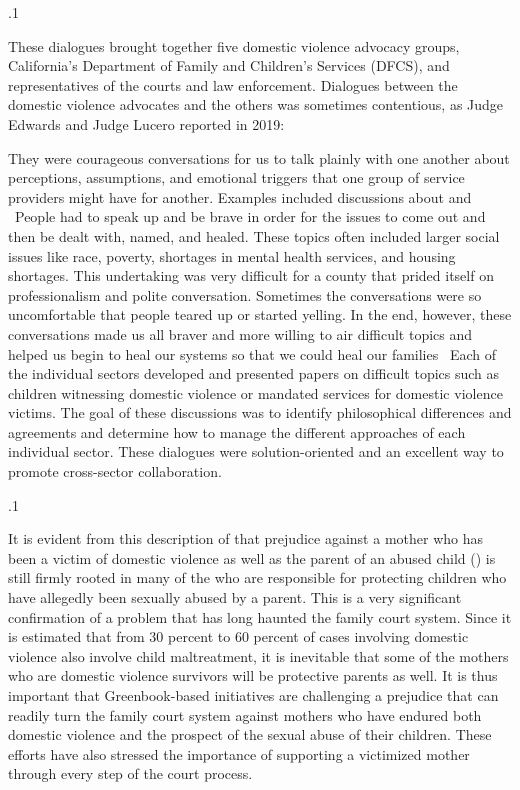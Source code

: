 \documentclass[11pt, twoside]{article}
\begin{document}
{\p.1{%
These dialogues brought together five domestic violence advocacy
groups, California’s Department of Family and Children’s Services
(DFCS), and representatives of the courts and law enforcement. Dialogues between the domestic violence advocates and the others was
sometimes contentious, as Judge Edwards and Judge Lucero reported
in 2019:

\begin{blockQuote}
They were courageous conversations for us to talk plainly with one
another about perceptions, assumptions, and emotional triggers
that one group of service providers might have for another. Examples included discussions about  and  \ellThree{2pt}{2pt}\
\parbreak{}
\ellThree{2pt}{2pt}\ People had to speak up and be brave in order for the issues to
come out and then be dealt with, named, and healed. These topics
often included larger social issues like race, poverty, shortages in
mental health services, and housing shortages. This undertaking
was very difficult for a county that prided itself on professionalism and polite conversation. Sometimes the conversations were so
uncomfortable that people teared up or started yelling. In the end,
however, these conversations made us all braver and more willing
to air difficult topics and helped us begin to heal our systems so
that we could heal our families\ellFour{2pt}{2pt}
\parbreak{}
\ellThree{2pt}{2pt}\ Each of the individual sectors developed and presented
papers on difficult topics such as children witnessing domestic violence or mandated services for domestic violence victims. The goal
of these discussions was to identify philosophical differences and
agreements and determine how to manage the different approaches
of each individual sector. These dialogues were solution-oriented
and an excellent way to promote cross-sector collaboration.
\end{blockQuote}

}%

\p.1{%
It is evident from this description of  that
prejudice against a mother who has been a victim of domestic violence
as well as the parent of an abused child (\q{Why does the parent victim go
back?}) is still firmly rooted in many of the \q{family court auxiliaries}
who are responsible for protecting children who have allegedly been
sexually abused by a parent. This is a very significant confirmation of
a problem that has long haunted the family court system. Since it is
estimated that from 30 percent to 60 percent of cases involving domestic violence also involve child maltreatment, it is inevitable that some
of the mothers who are domestic violence survivors will be protective
parents as well. It is thus important that Greenbook-based initiatives
are challenging a prejudice that can readily turn the family court system against mothers who have endured both domestic violence and
the prospect of the sexual abuse of their children. These efforts have
also stressed the importance of supporting a victimized mother through
every step of the court process.\fnm{27}

}}
\end{document}
